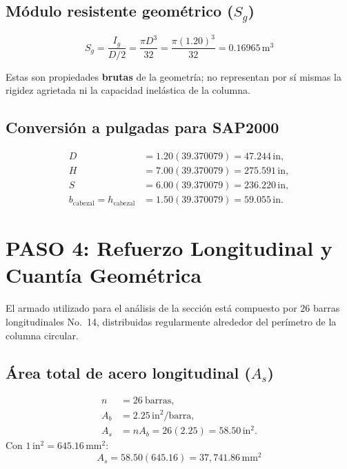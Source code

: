 \documentclass[11pt,a4paper]{article}
\begin{document}
\subsection{Módulo resistente geométrico ($S_g$)}
\begin{equation*}
S_g=\frac{I_g}{D/2}=\frac{\pi D^3}{32}
=\frac{\pi(1.20)^3}{32}
=\boxed{0.16965\,\mathrm{m}^3}
\end{equation*}

Estas son propiedades \textbf{brutas} de la geometría; no representan por sí
mismas la rigidez agrietada ni la capacidad inelástica de la columna.

\subsection{Conversión a pulgadas para SAP2000}
\begin{align*}
D&=1.20(39.370079)=\boxed{47.244\,\mathrm{in}},\\
H&=7.00(39.370079)=\boxed{275.591\,\mathrm{in}},\\
S&=6.00(39.370079)=\boxed{236.220\,\mathrm{in}},\\
b_{\mathrm{cabezal}}=h_{\mathrm{cabezal}}&=1.50(39.370079)=\boxed{59.055\,\mathrm{in}}.
\end{align*}

\section{PASO 4: Refuerzo Longitudinal y Cuantía Geométrica}

El armado utilizado para el análisis de la sección está compuesto por
$26$ barras longitudinales No.~14, distribuidas regularmente alrededor
del perímetro de la columna circular.

\subsection{Área total de acero longitudinal ($A_s$)}
\begin{align*}
n&=26\ \text{barras},\\
A_b&=2.25\,\mathrm{in}^2/\text{barra},\\
A_s&=n A_b=26(2.25)=58.50\,\mathrm{in}^2.
\end{align*}
Con $1\,\mathrm{in}^2=645.16\,\mathrm{mm}^2$:
\begin{equation*}
A_s=58.50(645.16)=\boxed{37{,}741.86\,\mathrm{mm}^2}
\end{equation*}
\end{document}
